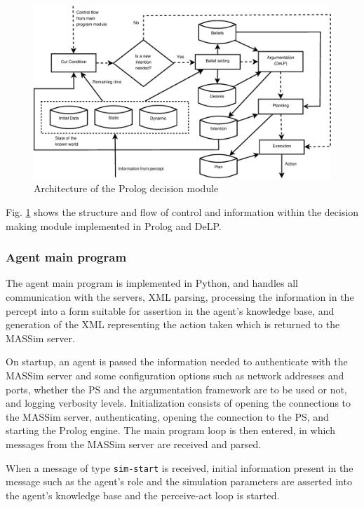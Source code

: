     \begin{figure}[!htb]
    \centering
    \includegraphics[width=\textwidth]{agentprolog.eps}
    \caption{Architecture of the Prolog decision module}
    \label{fig:prologmodule}
    \end{figure}

    Fig. \ref{fig:prologmodule} shows the structure and flow of control and
    information within the decision making module implemented in Prolog and
    DeLP.
    
\subsubsection{Agent main program}
    The agent main program is implemented in Python, and handles all
    communication with the servers, XML parsing, processing the information in
    the percept into a form suitable for assertion in the agent's knowledge
    base, and generation of the XML representing the action taken which is
    returned to the MASSim server.

    On startup, an agent is passed the information needed to authenticate with
    the MASSim server and some configuration options such as network addresses
    and ports, whether the PS and the argumentation framework are to
    be used or not, and logging verbosity levels.
    Initialization consists of opening the connections to the MASSim server,
    authenticating, opening the connection to the PS, and starting
    the Prolog engine. The main program loop is then entered, in which messages
    from the MASSim server are received and parsed. 

    When a message of type \texttt{sim-start} is received, initial information
    present in the message such as the agent's role and the simulation
    parameters are asserted into the agent's knowledge base and the perceive-act
    loop is started.

